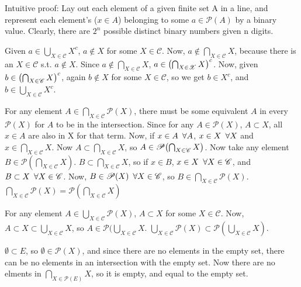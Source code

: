 \documentclass{article}
\DeclarePairedDelimiter\prn{(}{)}
\newcommand{\nl}[0]{\newline}
\begin{document}
\begin{flushleft}
Intuitive proof: Lay out each element of a given finite set A in a line, and represent each element's ($x \in A$) belonging to some $a \in \mathscr{P}(A)$ by a binary value. Clearly, there are $2^n$ possible distinct binary numbers given n digits. \nl

 \nl
Given $a \in \bigcup_{X \in \mathscr{C}} X^c$, $a \not\in X$ for some $X \in \mathscr{C}$. Now, $a \not\in \bigcap_{X \in \mathscr{C}} X$, because there is an $X \in \mathscr{C}$ s.t. $a\not\in X$. Since $a\not\in \bigcap_{X \in \mathscr{C}} X$, $a\in \prn*{\bigcap_{X \in \mathscr{X}} X}^c$. \nl \nl
Now, given $b \in \prn*{\bigcap_{X \in \mathscr{C}} X}^c$, again $b \not\in X$ for some $X \in \mathscr{C}$, so we get $b \in X^c$, and $b \in \bigcup_{X \in \mathscr{C}} X^c$. \nl

 \nl

 \nl
For any element $A \in \bigcap_{X \in \mathscr{C}} \mathscr{P}(X)$, there must be some equivalent $A$ in every $\mathscr{P}(X)$ for $A$ to be in the intersection. Since for any $A \in \mathscr{P}(X)$, $A \subset X$, all $x \in A$ are also in X for that term. Now, if $x \in A \kern5px \forall A$, $x \in X \kern5px \forall X$ and $x \in \bigcap_{X \in \mathscr{C}} X$. Now $A \subset \bigcap_{X \in \mathscr{C}} X$, so $A \in \mathscr{P}\prn*{\bigcap_{X \in \mathscr{C}} X}$. \nl \nl
Now take any element $B \in \mathscr{P}({\bigcap_{X \in \mathscr{C}} X})$. $B \subset \bigcap_{X \in \mathscr{C}} X$, so if $x \in B$, $x \in X \kern5px \forall X \in \mathscr{C}$, and $B \subset X \kern5px \forall X \in \mathscr{C}$. Now, $B \in \mathscr{P}(X) \kern5px \forall X \in \mathscr{C}$, so $B \in \bigcap_{X \in \mathscr{C}} \mathscr{P}(X)$. \nl \nl
$\bigcap_{X \in \mathscr{C}} \mathscr{P}(X) = \mathscr{P}(\bigcap_{X \in \mathscr{C}} X)$ \nl

 \nl
For any element $A \in \bigcup_{X \in \mathscr{C}} \mathscr{P}(X)$, $A \subset X$ for some $X \in \mathscr{C}$. Now, $A \subset X \subset \bigcup_{X \in \mathscr{C}} X$, so $A \in \mathscr{P}(\bigcup_{X \in \mathscr{C}} X$. \nl \nl
$\bigcup_{X \in \mathscr{C}} \mathscr{P}(X) \subset \mathscr{P}(\bigcup_{X \in \mathscr{C}} X)$. \nl

 \nl
$\emptyset \subset E$, so $\emptyset \in \mathscr{P}(X)$, and since there are no elements in the empty set, there can be no elements in an intersection with the empty set. Now there are no elments in $\bigcap_{X \in \mathscr{P}(E)} X$, so it is empty, and equal to the empty set. \nl


\end{flushleft}
\end{document}
